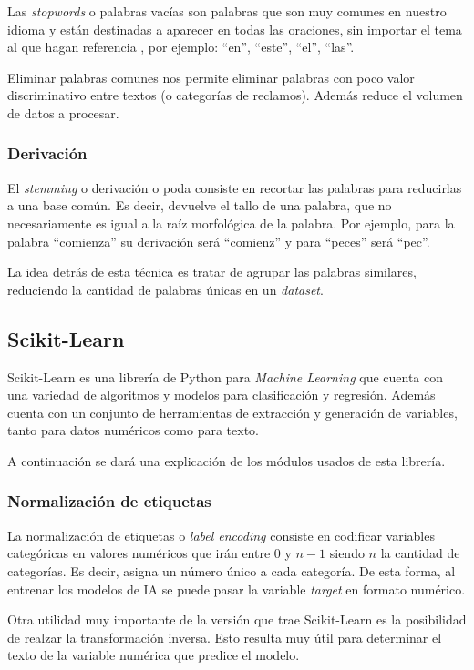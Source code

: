 Las \textit{stopwords} o palabras vacías son palabras que son muy comunes en nuestro idioma y están destinadas a aparecer en todas las oraciones, sin importar el tema al que hagan referencia \citep{WEBSITE:16}, por ejemplo: ``en'', ``este'', ``el'', ``las''.

Eliminar palabras comunes nos permite eliminar palabras con poco valor discriminativo entre textos (o categorías de reclamos). Además reduce el volumen de datos a procesar.

\subsubsection{Derivación}

El \textit{stemming} o derivación o poda consiste en recortar las palabras para reducirlas a una base común. Es decir, devuelve el tallo de una palabra, que no necesariamente es igual a la raíz morfológica de la palabra. Por ejemplo, para la palabra ``comienza'' su derivación será ``comienz'' y para ``peces'' será ``pec''.

La idea detrás de esta técnica es tratar de agrupar las palabras similares, reduciendo la cantidad de palabras únicas en un \textit{dataset}.

\subsection{Scikit-Learn}

Scikit-Learn es una librería de Python para \textit{Machine Learning} que cuenta con una variedad de algoritmos y modelos para clasificación y regresión. Además cuenta con un conjunto de herramientas de extracción y generación de variables, tanto para datos numéricos como para texto.

A continuación se dará una explicación de los módulos usados de esta librería.

\subsubsection{Normalización de etiquetas}

La normalización de etiquetas o \textit{label encoding} consiste en codificar variables categóricas en valores numéricos que irán entre 0 y $n-1$ siendo $n$ la cantidad de categorías. Es decir, asigna un número único a cada categoría. De esta forma, al entrenar los modelos de IA se puede pasar la variable \textit{target} en formato numérico. 

Otra utilidad muy importante de la versión que trae Scikit-Learn es la posibilidad de realzar la transformación inversa. Esto resulta muy útil para determinar el texto de la variable numérica que predice el modelo.

